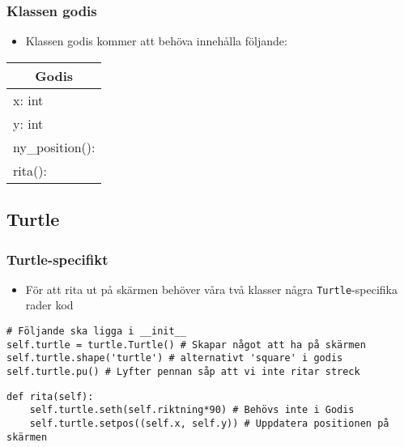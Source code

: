 \documentclass[aspectratio=169]{beamer}
\begin{document}
\begin{frame}
	\frametitle{Klassen godis}
	
	\begin{itemize}
		\item Klassen godis kommer att behöva innehålla följande:
	\end{itemize}
	
	\centering
	
	\begin{tabular}{|l|}
		\hline
		\multicolumn{1}{|c|}{Godis} \\ \hline
		x: int \\
		y: int \\ \hline
		ny\_position():\\
		rita():\\ \hline
	\end{tabular}
	
\end{frame}

\subsection{Turtle}

\begin{frame}[fragile]
	\frametitle{Turtle-specifikt}
	
	\begin{itemize}
		\item För att rita ut på skärmen behöver våra två klasser några \texttt{Turtle}-specifika rader kod
	\end{itemize}
	
	\begin{lstlisting}
# Följande ska ligga i __init__
self.turtle = turtle.Turtle() # Skapar något att ha på skärmen
self.turtle.shape('turtle') # alternativt 'square' i godis
self.turtle.pu() # Lyfter pennan såp att vi inte ritar streck
	\end{lstlisting}
	
	\begin{lstlisting}
def rita(self):
    self.turtle.seth(self.riktning*90) # Behövs inte i Godis
    self.turtle.setpos((self.x, self.y)) # Uppdatera positionen på skärmen
	\end{lstlisting}
	
\end{frame}
\end{document}
